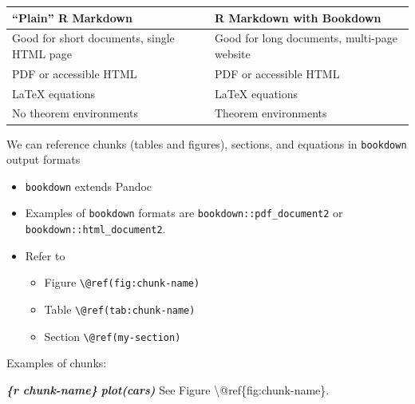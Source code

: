 \documentclass[
  a4paper,
  twoside,
  openright]{book}
\newenvironment{Shaded}{\begin{snugshade}}{\end{snugshade}}
\newcommand{\InformationTok}[1]{\textcolor[rgb]{0.56,0.35,0.01}{\textbf{\textit{#1}}}}
\newcommand{\NormalTok}[1]{#1}
\providecommand{\tightlist}{%
  \setlength{\itemsep}{0pt}\setlength{\parskip}{0pt}}
\theoremstyle{definition}
\theoremstyle{definition}
\theoremstyle{definition}
\theoremstyle{definition}
\theoremstyle{remark}
\begin{document}
\begin{longtable}[]{@{}
  >{\raggedright\arraybackslash}p{}
  >{\raggedright\arraybackslash}p{}@{}}
\toprule\noalign{}
\begin{minipage}[b]{\linewidth}\raggedright
``Plain'' R Markdown
\end{minipage} & \begin{minipage}[b]{\linewidth}\raggedright
R Markdown with Bookdown
\end{minipage} \\
\midrule\noalign{}
\endhead
\bottomrule\noalign{}
\endlastfoot
Good for short documents, single HTML page & Good for long documents, multi-page website \\
PDF or accessible HTML & PDF or accessible HTML \\
LaTeX equations & LaTeX equations \\
No theorem environments & Theorem environments \\
\end{longtable}

We can reference chunks (tables and figures), sections, and equations in \texttt{bookdown} output formats

\begin{itemize}
\tightlist
\item
  \texttt{bookdown} extends Pandoc
\item
  Examples of \texttt{bookdown} formats are \texttt{bookdown::pdf\_document2} or \texttt{bookdown::html\_document2}.
\item
  Refer to

  \begin{itemize}
  \tightlist
  \item
    Figure \texttt{\textbackslash{}@ref(fig:chunk-name)}
  \item
    Table \texttt{\textbackslash{}@ref(tab:chunk-name)}
  \item
    Section \texttt{\textbackslash{}@ref(my-section)}
  \end{itemize}
\end{itemize}

Examples of chunks:

\begin{Shaded}
\begin{Highlighting}[]
\InformationTok{\textasciigrave{}\textasciigrave{}\textasciigrave{}\{r chunk{-}name\}}
\InformationTok{plot(cars)}
\InformationTok{\textasciigrave{}\textasciigrave{}\textasciigrave{}} 
\NormalTok{See Figure \textbackslash{}@ref\{fig:chunk{-}name\}.}
\end{Highlighting}
\end{Shaded}
\end{document}
